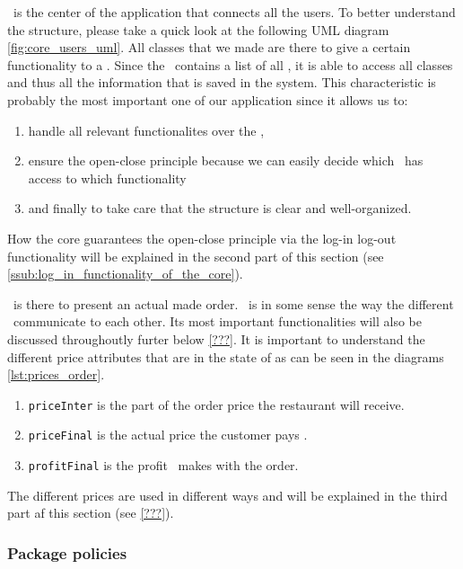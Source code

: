 \Core~is the center of the application that connects all the users. To better understand the structure, please take a quick look at the following UML diagram \ref{fig:core_users_uml}. All classes that we made are there to give a certain functionality to a \User. Since the \Core~contains a list of all \User, it is able to access all classes and thus all the information that is saved in the system. This characteristic is probably the most important one of our application since it allows us to:

\begin{enumerate}
	\item handle all relevant functionalites over the \Core,
	\item ensure the open-close principle because we can easily decide which \User~has access to which functionality 
	\item and finally to take care that the structure is clear and well-organized.
\end{enumerate}

How the core guarantees the open-close principle via the log-in log-out functionality will be explained in the second part of this section (see \ref{ssub:log_in_functionality_of_the_core}).

\Order~is there to present an actual made order. \Order~is in some sense the way the different \User~communicate to each other. Its most important functionalities will also be discussed throughoutly furter below \ref{???}. It is important to understand the different price attributes that are in the state of \Order as can be seen in the diagrams \ref{lst:prices_order}.

\begin{enumerate}
	\item \lstinline|priceInter| is the part of the order price the restaurant will receive.
	\item \lstinline|priceFinal| is the actual price the customer pays \MyFoodora.
	\item \lstinline|profitFinal| is the profit \MyFoodora~makes with the order. 
\end{enumerate}

The different prices are used in different ways and will be explained in the third part af this section (see \ref{???}).


\subsubsection{Package policies} %
\label{ssub:policies}

